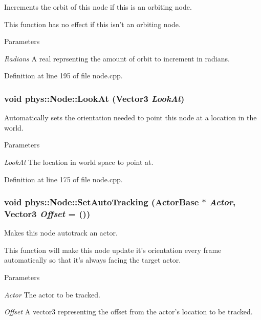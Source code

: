 Increments the orbit of this node if this is an orbiting node. 

This function has no effect if this isn't an orbiting node. 
\begin{DoxyParams}{Parameters}
\item[{\em Radians}]A real reprsenting the amount of orbit to increment in radians. \end{DoxyParams}


Definition at line 195 of file node.cpp.

\hypertarget{classphys_1_1Node_a545f5696660b3e7c07154b29421ab179}{
\subsubsection[{LookAt}]{\setlength{\rightskip}{0pt plus 5cm}void phys::Node::LookAt ({\bf Vector3} {\em LookAt})}}
\label{d0/ddc/classphys_1_1Node_a545f5696660b3e7c07154b29421ab179}


Automatically sets the orientation needed to point this node at a location in the world. 


\begin{DoxyParams}{Parameters}
\item[{\em LookAt}]The location in world space to point at. \end{DoxyParams}


Definition at line 175 of file node.cpp.

\hypertarget{classphys_1_1Node_adc570391b491821a13b58e15e0dc2cac}{
\subsubsection[{SetAutoTracking}]{\setlength{\rightskip}{0pt plus 5cm}void phys::Node::SetAutoTracking ({\bf ActorBase} $\ast$ {\em Actor}, \/  {\bf Vector3} {\em Offset} = {()})}}
\label{d0/ddc/classphys_1_1Node_adc570391b491821a13b58e15e0dc2cac}


Makes this node autotrack an actor. 

This function will make this node update it's orientation every frame automatically so that it's always facing the target actor. 
\begin{DoxyParams}{Parameters}
\item[{\em Actor}]The actor to be tracked. \item[{\em Offset}]A vector3 representing the offset from the actor's location to be tracked. \end{DoxyParams}


